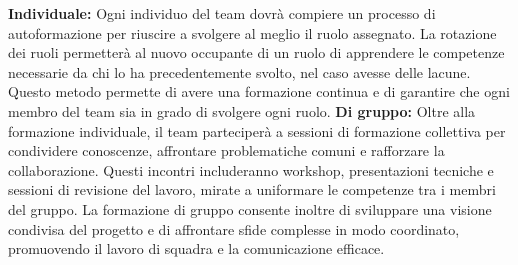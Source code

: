 \textbf{Individuale:}
Ogni individuo del team dovrà compiere un processo di autoformazione per riuscire a svolgere al meglio il ruolo assegnato. La rotazione dei ruoli permetterà al nuovo occupante di un ruolo di apprendere le competenze necessarie da chi lo ha precedentemente svolto, nel caso avesse delle lacune. Questo metodo permette di avere una formazione continua e di garantire che ogni membro del team sia in grado di svolgere ogni ruolo.
\textbf{Di gruppo:}
Oltre alla formazione individuale, il team parteciperà a sessioni di formazione collettiva per condividere conoscenze, affrontare problematiche comuni e rafforzare la collaborazione. Questi incontri includeranno workshop, presentazioni tecniche e sessioni di revisione del lavoro, mirate a uniformare le competenze tra i membri del gruppo. La formazione di gruppo consente inoltre di sviluppare una visione condivisa del progetto e di affrontare sfide complesse in modo coordinato, promuovendo il lavoro di squadra e la comunicazione efficace.

